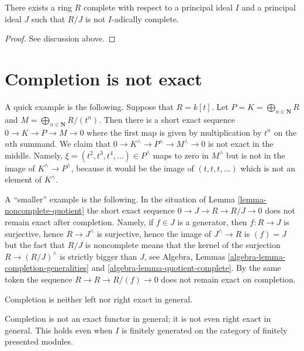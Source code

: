\begin{lemma}
\label{lemma-noncomplete-quotient}
There exists a ring $R$ complete with respect to a principal ideal
$I$ and a principal ideal $J$ such that $R/J$ is not $I$-adically
complete.
\end{lemma}

\begin{proof}
See discussion above.
\end{proof}



\section{Completion is not exact}
\label{section-completion-not-exact}

\noindent
A quick example is the following. Suppose that $R = k[t]$. Let
$P = K = \bigoplus_{n \in \mathbf{N}} R$ and
$M = \bigoplus_{n \in \mathbf{N}} R/(t^n)$. Then there is a short exact
sequence $0 \to K \to P \to M \to 0$ where the first map is given by
multiplication by $t^n$ on the $n$th summand. We claim that
$0 \to K^\wedge \to P^\wedge \to M^\wedge \to 0$ is not exact in the middle.
Namely, $\xi = (t^2, t^3, t^4, \ldots) \in P^\wedge$ maps to zero in
$M^\wedge$ but is not in the image of $K^\wedge \to P^\wedge$, because
it would be the image of $(t, t, t, \ldots)$ which is not an element of
$K^\wedge$.

\medskip\noindent
A ``smaller'' example is the following. In the situation of
Lemma \ref{lemma-noncomplete-quotient}
the short exact sequence $0 \to J \to R \to R/J \to 0$ does not remain
exact after completion. Namely, if $f \in J$ is a generator, then
$f : R \to J$ is surjective, hence $R \to J^\wedge$ is surjective, hence
the image of $J^\wedge \to R$ is $(f) = J$ but the fact that
$R/J$ is noncomplete means that the kernel of the surjection
$R \to (R/J)^\wedge$ is strictly bigger than $J$, see
Algebra, Lemmas \ref{algebra-lemma-completion-generalities} and
\ref{algebra-lemma-quotient-complete}.
By the same token the sequence
$R \to R \to R/(f) \to 0$ does not remain exact on completion.

\begin{lemma}
\label{lemma-completion-not-exact}
\begin{slogan}
Completion is neither left nor right exact in general.
\end{slogan}
Completion is not an exact functor in general; it is not even
right exact in general. This holds even when $I$ is finitely
generated on the category of finitely presented modules.
\end{lemma}

